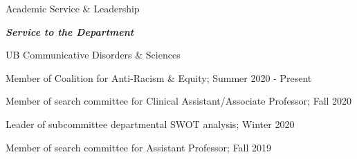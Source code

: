 \documentclass{resume} %
\begin{document}
\begin{rSection}{Academic Service \& Leadership}


\bigskip
\begin{center}
	{\bf \emph{Service to the Department}}\\
\end{center}



\begin{rSubsection}{UB Communicative Disorders \& Sciences}{}{}{}
	\item Member of Coalition for Anti-Racism \& Equity; Summer 2020 - Present
	\item Member of search committee for Clinical Assistant/Associate Professor; Fall 2020
	\item Leader of subcommittee departmental SWOT analysis; Winter 2020
	\item Member of search committee for Assistant Professor; Fall 2019
\end{rSubsection}


\end{rSection}
\end{document}
